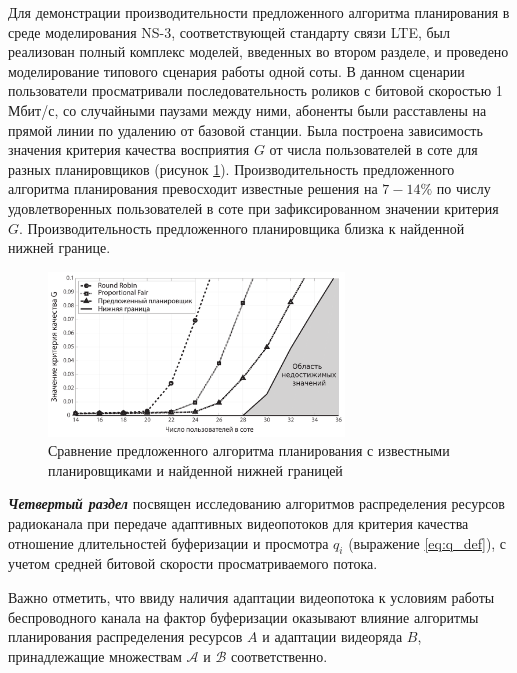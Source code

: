 Для демонстрации производительности предложенного алгоритма планирования в среде моделирования NS-3, соответствующей стандарту связи LTE, был реализован полный комплекс моделей, введенных во втором разделе, и проведено моделирование типового сценария работы одной соты. В данном сценарии пользователи просматривали последовательность роликов с битовой скоростью 1 Мбит/с, со случайными паузами между ними, абоненты были расставлены на прямой линии по удалению от базовой станции. Была построена зависимость значения критерия качества восприятия $G$ от числа пользователей в соте для разных планировщиков (рисунок \ref{fig:G_PLOT}). Производительность предложенного алгоритма планирования превосходит известные решения на $7-14\%$ по числу удовлетворенных пользователей в соте при зафиксированном значении критерия $G$. Производительность предложенного планировщика близка к найденной нижней границе.
\begin{figure}[htbp]
\begin{center}
\includegraphics[width=0.7\textwidth]{../Dissertation/images//Chapter3/G_PLOT.pdf}
\caption{Сравнение предложенного алгоритма планирования с известными планировщиками и найденной нижней границей}
\label{fig:G_PLOT}
\end{center}
\end{figure}

\textbf{\textit{Четвертый раздел}} посвящен исследованию алгоритмов распределения ресурсов радиоканала при передаче адаптивных видеопотоков для критерия качества отношение длительностей буферизации и просмотра $q_i$ (выражение \ref{eq:q_def}), с учетом средней битовой скорости просматриваемого потока.

Важно отметить, что ввиду наличия адаптации видеопотока к условиям работы беспроводного канала
на фактор буферизации оказывают влияние алгоритмы планирования распределения ресурсов $A$ и адаптации видеоряда $B$, принадлежащие множествам $\mathcal{A}$ и $\mathcal{B}$ соответственно.

